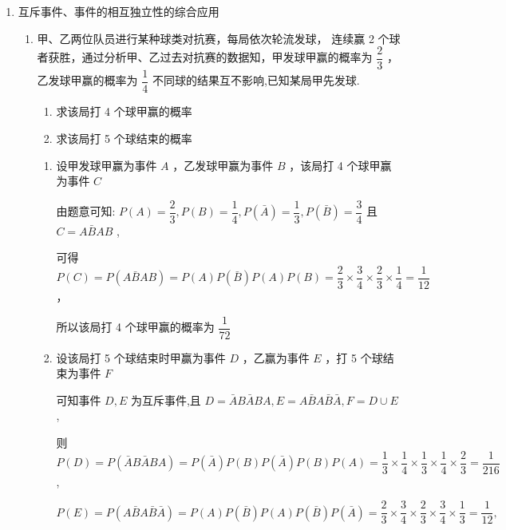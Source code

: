 \begin{enumerate}
    \item 互斥事件、事件的相互独立性的综合应用
    \begin{enumerate}
        \item 甲、乙两位队员进行某种球类对抗赛，每局依次轮流发球， 连续赢 2 个球者获胜，通过分析甲、乙过去对抗赛的数据知，甲发球甲赢的概率为 $\dfrac{2}{3}$ ，乙发球甲赢的概率为 $\dfrac{1}{4}$ 不同球的结果互不影响,已知某局甲先发球.
        \begin{enumerate}
            \item 求该局打 4 个球甲赢的概率
            \item 求该局打 5 个球结束的概率
        \end{enumerate}
        \begin{jieda}
            \begin{enumerate}
                \item 设甲发球甲赢为事件 $A$ ，乙发球甲赢为事件 $B$ ，该局打 4 个球甲赢为事件 $C$
                
                由题意可知: $P\left( A\right)  = \dfrac{2}{3},P\left( B\right)  = \dfrac{1}{4},P\left( \bar{A}\right)  = \dfrac{1}{3},P\left( \bar{B}\right)  = \dfrac{3}{4}$ 且 $C = A\bar{B}{AB}$ ,
                
                可得 $P\left( C\right)  = P\left( {A\bar{B}{AB}}\right)  = P\left( A\right) P\left( \bar{B}\right) P\left( A\right) P\left( B\right)  = \dfrac{2}{3} \times  \dfrac{3}{4} \times  \dfrac{2}{3} \times  \dfrac{1}{4} = \dfrac{1}{12}$ ，
                
                所以该局打 4 个球甲赢的概率为 $\dfrac{1}{72}$

                \item 设该局打 5 个球结束时甲赢为事件 $D$ ，乙赢为事件 $E$ ，打 5 个球结束为事件 $F$

                可知事件 $D,E$ 为互斥事件,且 $D = \bar{A}B\bar{A}{BA},E = A\bar{B}A\bar{B}\bar{A},F = D \cup  E$ ,
                
                则 $P\left( D\right)  = P\left( {\bar{A}B\bar{A}{BA}}\right)  = P\left( \bar{A}\right) P\left( B\right) P\left( \bar{A}\right) P\left( B\right) P\left( A\right)  = \dfrac{1}{3} \times  \dfrac{1}{4} \times  \dfrac{1}{3} \times  \dfrac{1}{4} \times  \dfrac{2}{3} = \dfrac{1}{216}$ ,
                
                $P\left( E\right)  = P\left( {A\bar{B}A\bar{B}\bar{A}}\right)  = P\left( A\right) P\left( \bar{B}\right) P\left( A\right) P\left( \bar{B}\right) P\left( \bar{A}\right)  = \dfrac{2}{3} \times  \dfrac{3}{4} \times  \dfrac{2}{3} \times  \dfrac{3}{4} \times  \dfrac{1}{3} = \dfrac{1}{12},$
                

\end{enumerate}
\end{jieda}
\end{enumerate}
\end{enumerate}
